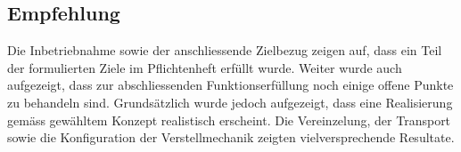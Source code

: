 \subsection{Empfehlung}

Die Inbetriebnahme sowie der anschliessende Zielbezug zeigen auf, dass ein Teil der formulierten Ziele im Pflichtenheft erfüllt wurde. Weiter wurde auch aufgezeigt, dass zur abschliessenden Funktionserfüllung noch einige offene Punkte zu behandeln sind. Grundsätzlich wurde jedoch aufgezeigt, dass eine Realisierung gemäss gewähltem Konzept realistisch erscheint. Die Vereinzelung, der Transport sowie die Konfiguration der Verstellmechanik zeigten vielversprechende Resultate. 